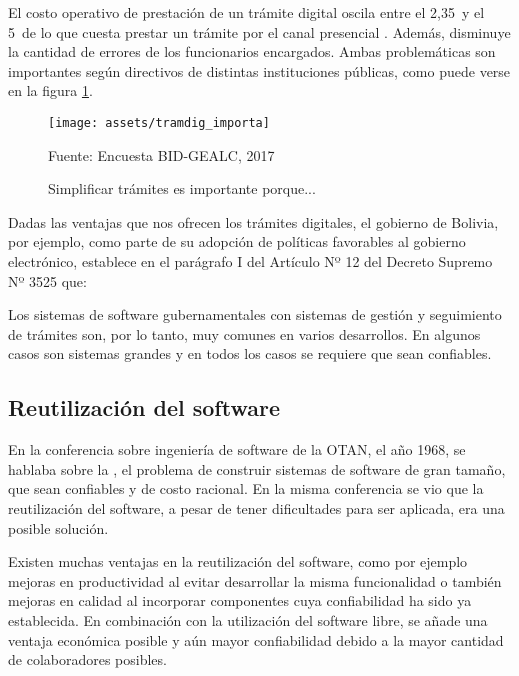 El costo operativo de prestación de un trámite digital oscila entre el 2,35\percentsign~y el 5\percentsign~de lo que cuesta prestar un trámite por el canal presencial \cite[11]{parejaGestionIdentidadSu}.
Además, disminuye la cantidad de errores de los funcionarios encargados.
Ambas problemáticas son importantes según directivos de distintas instituciones públicas, como puede verse en la figura \ref{fig:tramdig_importa}.

\begin{figure}[!hbpt]
    \centering
    \texttt{[image: assets/tramdig\_importa]}
    \caption{Simplificar trámites es importante porque...}{Fuente: Encuesta BID-GEALC, 2017}
    \label{fig:tramdig_importa}
\end{figure}

Dadas las ventajas que nos ofrecen los trámites digitales, el gobierno de Bolivia, por ejemplo, como parte de su adopción de políticas favorables al gobierno electrónico,
establece en el parágrafo I del Artículo Nº 12 del Decreto Supremo Nº 3525\cite{DECRETOSUPREMO35252018} que:

Los sistemas de software gubernamentales con sistemas de gestión y seguimiento de trámites son, por lo tanto, muy comunes en varios desarrollos.
En algunos casos son sistemas grandes y en todos los casos se requiere que sean confiables.

\subsection{Reutilización del software}

En la conferencia sobre ingeniería de software de la OTAN, el año 1968, se hablaba sobre la ,
el problema de construir sistemas de software de gran tamaño, que sean confiables y de costo racional.
En la misma conferencia se vio que la reutilización del software, a pesar de tener dificultades para ser aplicada, era una posible solución\cite{kruegerSoftwareReuse1992}.

Existen muchas ventajas en la reutilización del software,
como por ejemplo mejoras en productividad al evitar desarrollar la misma funcionalidad o también
mejoras en calidad al incorporar componentes cuya confiabilidad ha sido ya establecida\cite{selbyEnablingReusebasedSoftware2005}.
En combinación con la utilización del software libre, se añade una ventaja económica posible y aún mayor confiabilidad debido a la mayor cantidad de colaboradores posibles.

